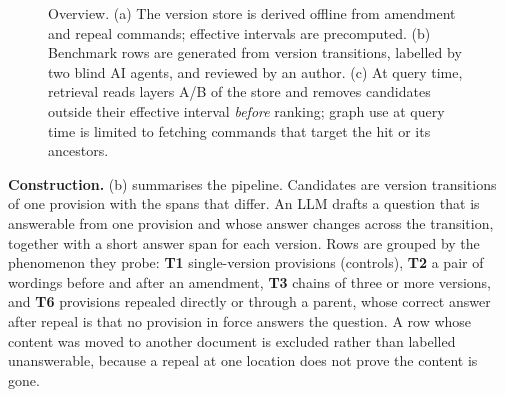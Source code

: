 \documentclass[sigconf,anonymous,review]{acmart}
\begin{document}
\begin{figure}[t]
\caption{Overview. (a) The version store is derived offline from amendment and repeal commands; effective intervals are precomputed. (b) Benchmark rows are generated from version transitions, labelled by two blind AI agents, and reviewed by an author. (c) At query time, retrieval reads layers A/B of the store and removes candidates outside their effective interval \emph{before} ranking; graph use at query time is limited to fetching commands that target the hit or its ancestors.}
\label{fig:overview}
\end{figure}

\textbf{Construction.} (b) summarises the pipeline. Candidates are version transitions of one provision with the spans that differ. An LLM drafts a question that is answerable from one provision and whose answer changes across the transition, together with a short answer span for each version. Rows are grouped by the phenomenon they probe: \textbf{T1} single-version provisions (controls), \textbf{T2} a pair of wordings before and after an amendment, \textbf{T3} chains of three or more versions, and \textbf{T6} provisions repealed directly or through a parent, whose correct answer after repeal is that no provision in force answers the question. A row whose content was moved to another document is excluded rather than labelled unanswerable, because a repeal at one location does not prove the content is gone.
\end{document}
